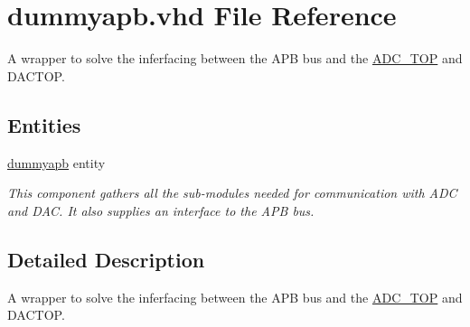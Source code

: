\hypertarget{dummyapb_8vhd}{\section{dummyapb.\-vhd File Reference}
\label{dummyapb_8vhd}
}


A wrapper to solve the inferfacing between the A\-P\-B bus and the \hyperlink{classADC__TOP}{A\-D\-C\-\_\-\-T\-O\-P} and D\-A\-C\-T\-O\-P.  


\subsection*{Entities}
\begin{DoxyCompactItemize}
\item 
\hyperlink{classdummyapb}{dummyapb} entity
\begin{DoxyCompactList}\small\item\em This component gathers all the sub-\/modules needed for communication with A\-D\-C and D\-A\-C. It also supplies an interface to the A\-P\-B bus. \end{DoxyCompactList}\end{DoxyCompactItemize}


\subsection{Detailed Description}
A wrapper to solve the inferfacing between the A\-P\-B bus and the \hyperlink{classADC__TOP}{A\-D\-C\-\_\-\-T\-O\-P} and D\-A\-C\-T\-O\-P. 